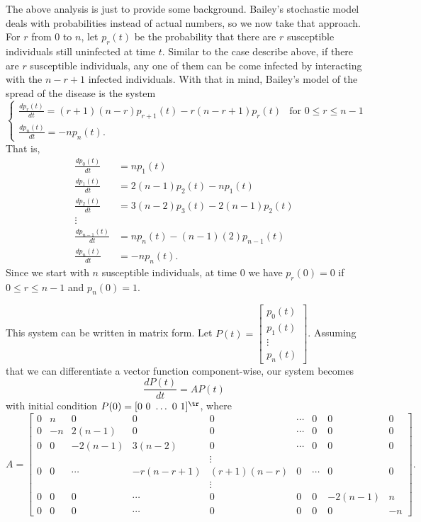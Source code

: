 The above analysis is just to provide some background. Bailey's stochastic model deals with probabilities instead of actual numbers, so we now take that approach. For $r$ from $0$ to $n$, let $p_r(t)$ be the probability that there are $r$ susceptible individuals still uninfected at time $t$. Similar to the case describe above, if there are $r$ susceptible individuals, any one of them can be come infected by interacting with the $n-r+1$ infected individuals. With that in mind, 
Bailey's model of the spread of the disease is the system 
\[\begin{cases} \frac{d p_r(t)}{dt} = (r+1)(n-r)p_{r+1}(t) - r(n-r+1)p_r(t) &\text{for } 0 \leq r \leq n-1\\
\frac{dp_n(t)}{dt} = -np_n(t). &
\end{cases}\]
That is,
\begin{align*}
\frac{d p_0(t)}{dt} &= np_1(t) \\
\frac{d p_1(t)}{dt} &= 2(n-1)p_2(t) - np_1(t)  \\
\frac{d p_2(t)}{dt} &= 3(n-2)p_3(t) - 2(n-1)p_2(t)  \\
\vdots & \\
\frac{d p_{n-1}(t)}{dt} &= np_n(t) - (n-1)(2)p_{n-1}(t)  \\
\frac{dp_n(t)}{dt} &= -np_n(t).
\end{align*}
Since we start with $n$ susceptible individuals, at time $0$ we have $p_r(0) = 0$ if $0 \leq r \leq n-1$ and $p_n(0)=1$. 

This system can be written in matrix form. Let $P(t) = \left[ \begin{array}{c} p_0(t)\\p_1(t) \\ \vdots \\ p_n(t) \end{array} \right]$. Assuming that we can differentiate a vector function component-wise, our system becomes
\[\frac{dP(t)}{dt} = A P(t)\]
with initial condition $P(0) = [0 \ 0 \ \ldots \ 0 \ 1]^{\tr}$, where 
\[A=\left[ \begin{array}{ccccccccc} 0&n&0&0&0& \cdots &0&0&0 \\ 0&-n&2(n-1)&0 &0&\cdots &0&0&0 \\ 0&0&-2(n-1)&3(n-2) &0 & \cdots & 0&0&0 \\ &&&&\vdots&&&& \\ 0&0& \cdots &-r(n-r+1) &(r+1)(n-r)& 0 & \cdots & 0&0 \\ &&&&\vdots&&&&  \\ 0&0&0&\cdots&0&0 &0&-2(n-1)&n \\ 0&0&0&\cdots&0&0&0&0&-n \end{array} \right].\] 

